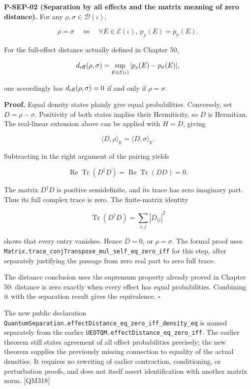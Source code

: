 \documentclass[
  11pt,
  oneside]{book}
\begin{document}
\label{p-sep-02}{}

\textbf{P-SEP-02 (Separation by all effects and the matrix meaning of
zero distance).} For any \(\rho,\sigma\in\mathcal D(\iota)\),

\[
\rho=\sigma
\quad\Longleftrightarrow\quad
\forall E\in\mathcal E(\iota),\ p_\rho(E)=p_\sigma(E).
\]

For the full-effect distance actually defined in Chapter 50,

\[
d_{\rm eff}(\rho,\sigma)
=\sup_{E\in\mathcal E(\iota)}
|p_\rho(E)-p_\sigma(E)|,
\]

one accordingly has \(d_{\rm eff}(\rho,\sigma)=0\) if and only if
\(\rho=\sigma\).

\textbf{Proof.} Equal density states plainly give equal probabilities.
Conversely, set \(D=\rho-\sigma\). Positivity of both states implies
their Hermiticity, so \(D\) is Hermitian. The real-linear extension
above can be applied with \(H=D\), giving

\[
\langle D,\rho\rangle_{\mathbb R}
=\langle D,\sigma\rangle_{\mathbb R}.
\]

Subtracting in the right argument of the pairing yields

\[
\operatorname{Re}\operatorname{Tr}(D^\dagger D)
=\operatorname{Re}\operatorname{Tr}(DD)=0.
\]

The matrix \(D^\dagger D\) is positive semidefinite, and its trace has
zero imaginary part. Thus its full complex trace is zero. The
finite-matrix identity

\[
\operatorname{Tr}(D^\dagger D)
=\sum_{i,j}|D_{ij}|^2
\]

shows that every entry vanishes. Hence \(D=0\), or \(\rho=\sigma\). The
formal proof uses
\texttt{Matrix.\allowbreak trace\_\allowbreak conj\allowbreak Transpose\_\allowbreak mul\_\allowbreak self\_\allowbreak eq\_\allowbreak zero\_\allowbreak iff} for this
step, after separately justifying the passage from zero real part to
zero full trace.

The distance conclusion uses the supremum property already proved in
Chapter 50: distance is zero exactly when every effect has equal
probabilities. Combining it with the separation result gives the
equivalence. \(\square\)

The new public declaration
\texttt{Quantum\allowbreak Separation.\allowbreak effect\allowbreak Distance\_\allowbreak eq\_\allowbreak zero\_\allowbreak iff\_\allowbreak density\_\allowbreak eq} is
named separately from the earlier
\texttt{UEOTQM.\allowbreak effect\allowbreak Distance\_\allowbreak eq\_\allowbreak zero\_\allowbreak iff}. The earlier theorem still
states agreement of all effect probabilities precisely; the new theorem
supplies the previously missing connection to equality of the actual
densities. It requires no rewriting of earlier contraction,
conditioning, or perturbation proofs, and does not itself assert
identification with another matrix norm. {[}QM318{]}
\end{document}
